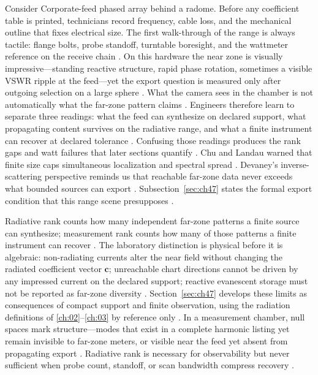 \begin{physicalvignette}
Consider Corporate-feed phased array behind a radome. Before any coefficient table is printed, technicians record frequency, cable loss, and the mechanical outline that fixes electrical size. The first walk-through of the range is always tactile: flange bolts, probe standoff, turntable boresight, and the wattmeter reference on the receive chain \cite{hansen1988}.
On this hardware the near zone is visually impressive---standing reactive structure, rapid phase rotation, sometimes a visible VSWR ripple at the feed---yet the export question is measured only after outgoing selection on a large sphere \cite{harrington2001}. What the camera sees in the chamber is not automatically what the far-zone pattern claims \cite{stratton1941}.
Engineers therefore learn to separate three readings: what the feed can synthesize on declared support, what propagating content survives on the radiative range, and what a finite instrument can recover at declared tolerance \cite{devaney2004}. Confusing those readings produces the rank gaps and watt failures that later sections quantify \cite{pal2026}.
Chu and Landau warned that finite size caps simultaneous localization and spectral spread \cite{chu1948}. Devaney's inverse-scattering perspective reminds us that reachable far-zone data never exceeds what bounded sources can export \cite{devaney2004}.
Subsection~\ref{sec:ch47} states the formal export condition that this range scene presupposes \cite{stratton1941}.
\end{physicalvignette}
Radiative rank counts how many independent far-zone patterns a finite source can synthesize; measurement rank counts how many of those patterns a finite instrument can recover \cite{stratton1941}. The laboratory distinction is physical before it is algebraic: non-radiating currents alter the near field without changing the radiated coefficient vector $\mathbf{c}$; unreachable chart directions cannot be driven by any impressed current on the declared support; reactive evanescent storage must not be reported as far-zone diversity \cite{devaney2004}. Section~\ref{sec:ch47} develops these limits as consequences of compact support and finite observation, using the radiation definitions of \ref{ch:02}--\ref{ch:03} by reference only \cite{stratton1941}.
In a measurement chamber, null spaces mark structure---modes that exist in a complete harmonic listing yet remain invisible to far-zone meters, or visible near the feed yet absent from propagating export \cite{devaney2004}. Radiative rank is necessary for observability but never sufficient when probe count, standoff, or scan bandwidth compress recovery \cite{jackson1999}.
